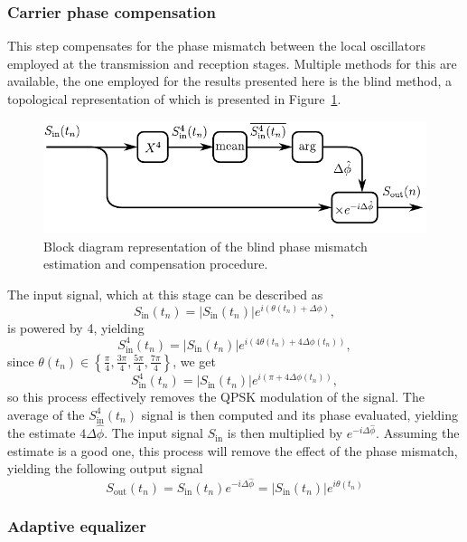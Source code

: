 \subsubsection{Carrier phase compensation}

This step compensates for the phase mismatch between the local oscillators employed at the transmission and reception stages. Multiple methods for this are available, the one employed for the results presented here is the blind method, a topological representation of which is presented in Figure~\ref{fig:mqamDiagramDSP_CPE_blind}.
%
\begin{figure}[h]
\centering
\includegraphics[width=.7\linewidth]{./sdf/m_qam_system/figures/DSP_section/diagramDSP_CPE_blind}
\caption{Block diagram representation of the blind phase mismatch estimation and compensation procedure.}
\label{fig:mqamDiagramDSP_CPE_blind}
\end{figure}
%
The input signal, which at this stage can be described as
\begin{equation}
S_\text{in}(t_n)=|S_\text{in}(t_n)|e^{i\left(\theta(t_n)+\Delta\phi\right)},
\end{equation}
is powered by 4, yielding
\begin{equation}
S^4_\text{in}(t_n)=|S_\text{in}(t_n)|e^{i\left(4\theta(t_n)+4\Delta\phi(t_n)\right)},
\end{equation}
since $\theta(t_n)\in\left\lbrace \frac{\pi}{4},\frac{3\pi}{4},\frac{5\pi}{4},\frac{7\pi}{4}\right\rbrace$, we get
\begin{equation}
S^4_\text{in}(t_n)=|S_\text{in}(t_n)|e^{i\left(\pi+4\Delta\phi(t_n)\right)},
\end{equation}
so this process effectively removes the QPSK modulation of the signal. The average of the $S^4_\text{in}(t_n)$ signal is then computed and its phase evaluated, yielding the estimate $4\Delta \hat{\phi}$. The input signal $S_\text{in}$ is then multiplied by $e^{-i\Delta\hat{\phi}}$. Assuming the estimate is a good one, this process will remove the effect of the phase mismatch, yielding the following output signal
\begin{equation}
S_\text{out}(t_n)=S_\text{in}(t_n)e^{-i\Delta\hat{\phi}}=|S_\text{in}(t_n)|e^{i\theta(t_n)}
\end{equation}

\subsubsection{Adaptive equalizer}
